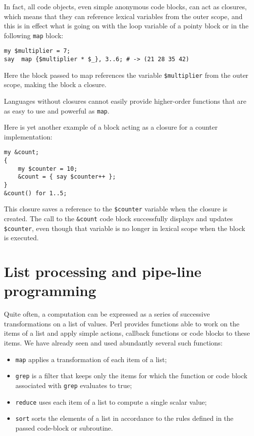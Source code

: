 In fact, all code objects, even simple anonymous code 
blocks, can act as closures, which means that they can 
reference lexical variables from the outer scope, and this 
is in effect what is going on with the loop variable of 
a pointy block or in the following {\tt map} block:

\begin{verbatim}
my $multiplier = 7;
say  map {$multiplier * $_}, 3..6; # -> (21 28 35 42)
\end{verbatim}

Here the block passed to map references the variable 
\verb'$multiplier' from the outer scope, making the 
block a closure.

Languages without closures cannot easily provide 
higher-order functions that are as easy to use and 
powerful as {\tt map}.

Here is yet another example of a block acting as a 
closure for a counter implementation:

\begin{verbatim}
my &count;
{
    my $counter = 10;
    &count = { say $counter++ };
}
&count() for 1..5;  
\end{verbatim}

This closure saves a reference to the \verb'$counter' 
variable when the closure is created. The call to the 
\verb'&count' code block successfully displays and 
updates \verb'$counter', even though that variable is no
longer in lexical scope when the block is executed.

\section{List processing and pipe-line programming}

Quite often, a computation can be expressed as a 
series of successive transformations on a list of 
values. Perl provides functions able to work on 
the items of a list and apply simple actions, 
callback functions or code blocks to these items. 
We have already seen and used abundantly several 
such functions:
\begin{itemize}
\item {\tt map} applies a transformation of each item 
of a list;
 
\item {\tt grep} is a filter that keeps only the items 
for which the function or code block associated with 
{\tt grep} evaluates to true;
 
\item {\tt reduce} uses each item of a list to compute 
a single scalar value;
 
\item {\tt sort} sorts the elements of a list in accordance 
to the rules defined in the passed code-block or 
subroutine. 
 
\end{itemize}

